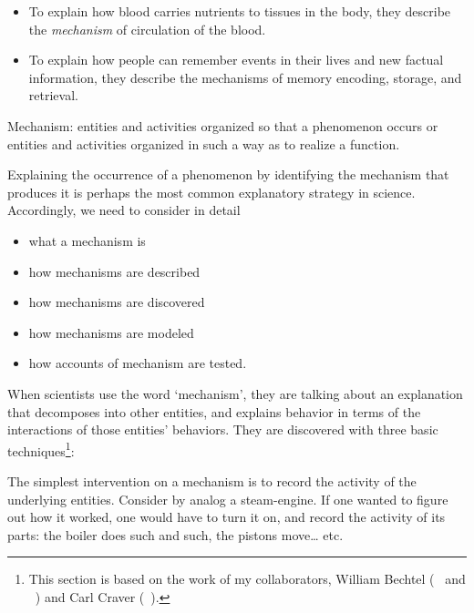 \begin{refsection}
\begin{itemize}
\item To explain how blood carries nutrients to tissues in the body, they describe the \emph{mechanism} of circulation of the blood.

\item To explain how people can remember events in their lives and new factual information, they describe the mechanisms of memory encoding, storage, and retrieval.

\end{itemize}

\begin{thesis}
Mechanism: entities and activities organized so that a phenomenon occurs or entities and activities organized in such a way as to realize a function.
\end{thesis} 

Explaining the occurrence of a phenomenon by identifying the mechanism that produces it is perhaps the most common explanatory strategy in science. Accordingly, we need to consider in detail

\begin{itemize}
\item what a mechanism is

\item how mechanisms are described

\item how mechanisms are discovered

\item how mechanisms are modeled

\item how accounts of mechanism are tested.

\end{itemize}

When scientists use the word ‘mechanism’, they are talking about an explanation that decomposes into other entities, and explains behavior in terms of the interactions of those entities’ behaviors. They are discovered with three basic techniques\footnote{This section is based on the work of my collaborators, William Bechtel (~\citep{Bechtel:2010we} and ~\citep{Bechtel:OYBoWb_-}) and Carl Craver (~\citep{Craver:2006ti}).}:

 The simplest intervention on a mechanism is to record the activity of the underlying entities. Consider by analog a steam-engine. If one wanted to figure out how it worked, one would have to turn it on, and record the activity of its parts: the boiler does such and such, the pistons move{\ldots} etc.


\end{refsection}

